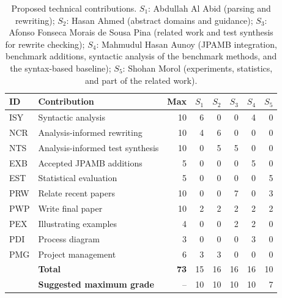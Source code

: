 \documentclass[review,nonacm,acmsmall]{acmart}
\begin{document}
\begin{table}[H]
\centering
\caption{Proposed technical contributions. $S_1$: Abdullah Al Abid (parsing
and rewriting); $S_2$: Hasan Ahmed (abstract domains and guidance);
$S_3$: Afonso Fonseca Morais de Sousa Pina (related work and test synthesis
for rewrite checking); $S_4$: Mahmudul Hasan Aunoy (JPAMB integration,
benchmark additions, syntactic analysis of the benchmark methods, and the
syntax-based baseline); $S_5$: Shohan Morol (experiments, statistics, and
part of the related work).}
\label{tab:contributions}
\scriptsize
\setlength{\tabcolsep}{3pt}
\begin{tabular}{@{}llrrrrrr@{}}
\toprule
ID & Contribution & Max & $S_1$ & $S_2$ & $S_3$ & $S_4$ & $S_5$ \\
\midrule
ISY & Syntactic analysis & 10 & 6 & 0 & 0 & 4 & 0 \\
NCR & Analysis-informed rewriting & 10 & 4 & 6 & 0 & 0 & 0 \\
NTS & Analysis-informed test synthesis & 10 & 0 & 5 & 5 & 0 & 0 \\
EXB & Accepted JPAMB additions & 5 & 0 & 0 & 0 & 5 & 0 \\
EST & Statistical evaluation & 5 & 0 & 0 & 0 & 0 & 5 \\
PRW & Relate recent papers & 10 & 0 & 0 & 7 & 0 & 3 \\
PWP & Write final paper & 10 & 2 & 2 & 2 & 2 & 2 \\
PEX & Illustrating examples & 4 & 0 & 0 & 2 & 2 & 0 \\
PDI & Process diagram & 3 & 0 & 0 & 0 & 3 & 0 \\
PMG & Project management & 6 & 3 & 3 & 0 & 0 & 0 \\
\midrule
& \textbf{Total} & \textbf{73} & 15 & 16 & 16 & 16 & 10 \\
& \textbf{Suggested maximum grade} & -- & 10 & 10 & 10 & 10 & 7 \\

\bottomrule
\end{tabular}
\end{table}
\end{document}
